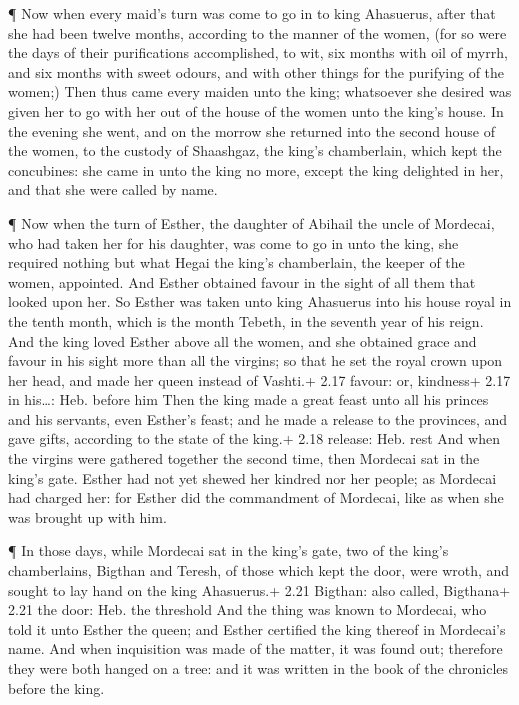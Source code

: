  ¶ Now when every maid's turn was come to go in to king
Ahasuerus, after that she had been twelve months, according to the
manner of the women, (for so were the days of their purifications
accomplished, to wit, six months with oil of myrrh, and six months with
sweet odours, and with other things for the purifying of the women;)
 Then thus came every maiden unto the king; whatsoever she
desired was given her to go with her out of the house of the women unto
the king's house.  In the evening she went, and on the
morrow she returned into the second house of the women, to the custody
of Shaashgaz, the king's chamberlain, which kept the concubines: she
came in unto the king no more, except the king delighted in her, and
that she were called by name.

 ¶ Now when the turn of Esther, the daughter of Abihail the
uncle of Mordecai, who had taken her for his daughter, was come to go in
unto the king, she required nothing but what Hegai the king's
chamberlain, the keeper of the women, appointed. And Esther obtained
favour in the sight of all them that looked upon her.  So
Esther was taken unto king Ahasuerus into his house royal in the tenth
month, which is the month Tebeth, in the seventh year of his reign.
 And the king loved Esther above all the women, and she
obtained grace and favour in his sight more than all the virgins; so
that he set the royal crown upon her head, and made her queen instead of
Vashti.+ 2.17 favour: or, kindness+ 2.17 in his\ldots: Heb. before him
 Then the king made a great feast unto all his princes and
his servants, even Esther's feast; and he made a release to the
provinces, and gave gifts, according to the state of the king.+ 2.18
release: Heb. rest  And when the virgins were gathered
together the second time, then Mordecai sat in the king's gate.
 Esther had not yet shewed her kindred nor her people; as
Mordecai had charged her: for Esther did the commandment of Mordecai,
like as when she was brought up with him.

 ¶ In those days, while Mordecai sat in the king's gate,
two of the king's chamberlains, Bigthan and Teresh, of those which kept
the door, were wroth, and sought to lay hand on the king Ahasuerus.+
2.21 Bigthan: also called, Bigthana+ 2.21 the door: Heb. the threshold
 And the thing was known to Mordecai, who told it unto
Esther the queen; and Esther certified the king thereof in Mordecai's
name.  And when inquisition was made of the matter, it was
found out; therefore they were both hanged on a tree: and it was written
in the book of the chronicles before the king.

